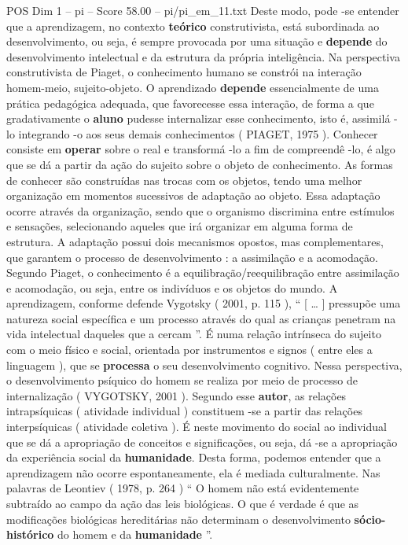 \begin{textsample}{POS Dim 1 – pi – Score 58.00 – pi/pi\_em\_11.txt}
Deste modo, pode -se entender que a aprendizagem, no contexto \textbf{teórico} construtivista, está subordinada ao desenvolvimento, ou seja, é sempre provocada por uma situação e \textbf{depende} do desenvolvimento intelectual e da estrutura da própria inteligência.
Na perspectiva construtivista de Piaget, o conhecimento humano se constrói na interação homem-meio, sujeito-objeto.
O aprendizado \textbf{depende} essencialmente de uma prática pedagógica adequada, que favorecesse essa interação, de forma a que gradativamente o \textbf{aluno} pudesse internalizar esse conhecimento, isto é, assimilá -lo integrando -o aos seus demais conhecimentos ( PIAGET, 1975 ).
Conhecer consiste em \textbf{operar} sobre o real e transformá -lo a fim de compreendê -lo, é algo que se dá a partir da ação do sujeito sobre o objeto de conhecimento.
As formas de conhecer são construídas nas trocas com os objetos, tendo uma melhor organização em momentos sucessivos de adaptação ao objeto.
Essa adaptação ocorre através da organização, sendo que o organismo discrimina entre estímulos e sensações, selecionando aqueles que irá organizar em alguma forma de estrutura.
A adaptação possui dois mecanismos opostos, mas complementares, que garantem o processo de desenvolvimento : a assimilação e a acomodação.
Segundo Piaget, o conhecimento é a equilibração/reequilibração entre assimilação e acomodação, ou seja, entre os indivíduos e os objetos do mundo.
A aprendizagem, conforme defende Vygotsky ( 2001, p. 115 ), “ [ … ] pressupõe uma natureza social específica e um processo através do qual as crianças penetram na vida intelectual daqueles que a cercam ”.
É numa relação intrínseca do sujeito com o meio físico e social, orientada por instrumentos e signos ( entre eles a linguagem ), que se \textbf{processa} o seu desenvolvimento cognitivo.
Nessa perspectiva, o desenvolvimento psíquico do homem se realiza por meio de processo de internalização ( VYGOTSKY, 2001 ).
Segundo esse \textbf{autor}, as relações intrapsíquicas ( atividade individual ) constituem -se a partir das relações interpsíquicas ( atividade coletiva ).
É neste movimento do social ao individual que se dá a apropriação de conceitos e significações, ou seja, dá -se a apropriação da experiência social da \textbf{humanidade}.
Desta forma, podemos entender que a aprendizagem não ocorre espontaneamente, ela é mediada culturalmente.
Nas palavras de Leontiev ( 1978, p. 264 ) “ O homem não está evidentemente subtraído ao campo da ação das leis biológicas.
O que é verdade é que as modificações biológicas hereditárias não determinam o desenvolvimento \textbf{sócio-histórico} do homem e da \textbf{humanidade} ”.

\end{textsample}
